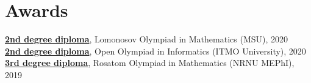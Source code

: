 \section{Awards}
\begin{itemize}[leftmargin=0.15in, label={}]
  \small{\item{
    \textbf{\href{https://theseems.ru/diploma/lomonosov2020}{2nd degree diploma}}, Lomonosov Olympiad in Mathematics (MSU), 2020 \\
    \textbf{\href{https://theseems.ru/diploma/open2020}{2nd degree diploma}}, Open Olympiad in Informatics (ITMO University), 2020 \\
    \textbf{\href{https://theseems.ru/diploma/rosatom2019}{3rd degree diploma}}, Rosatom Olympiad in Mathematics (NRNU MEPhI), 2019
  }}
\end{itemize}